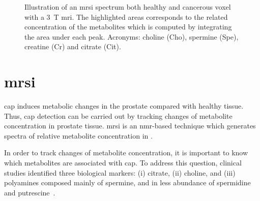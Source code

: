 \begin{figure}
	\centering
	\hspace*{\fill}
	 \hfill
	\hspace*{\fill}
	\caption[Illustration of healthy and cancerous \acs*{mrsi} spectrum.]{Illustration of an \acs*{mrsi} spectrum both healthy and cancerous voxel with a \SI{3}{\tesla} \acs*{mri}. The highlighted areas corresponds to the related concentration of the metabolites which is computed by integrating the area under each peak. Acronyms: choline (Cho), spermine (Spe), creatine (Cr) and citrate (Cit).}
	\label{fig:mrsi}
\end{figure}


\section{\acs*{mrsi}}\label{subsec:chp2:imaging:mrsi}
\ac{cap} induces metabolic changes in the prostate compared with healthy tissue.
Thus, \ac{cap} detection can be carried out by tracking changes of metabolite concentration in prostate tissue.
\ac{mrsi} is an \ac{nmr}-based technique which generates spectra of relative metabolite concentration in .

In order to track changes of metabolite concentration, it is important to know which metabolites are associated with \ac{cap}.
To address this question, clinical studies identified three biological markers: (i) citrate, (ii) choline, and (iii) polyamines composed mainly of spermine, and in less abundance of spermidine and putrescine~\cite{Awwad2012,Costello2006,Giskeodegard2013}. 

